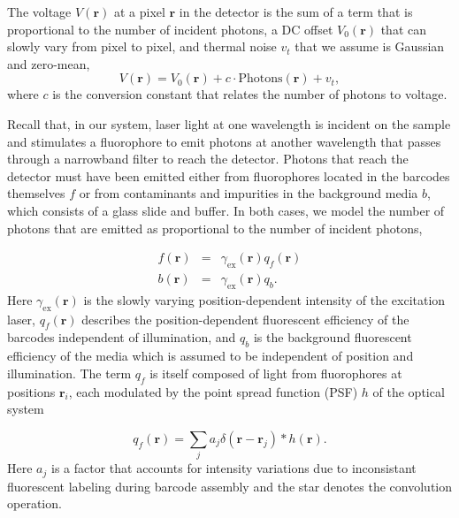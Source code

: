 The voltage $V(\mathbf{r})$ at a pixel $\mathbf{r}$ in the detector is the sum of a term that is proportional to the number of incident photons, a DC offset $V_0(\mathbf{r})$ that can slowly vary from pixel to pixel, and thermal noise $v_t$ that we assume is Gaussian and zero-mean,
\begin{equation}\label{eq:V_of_r}
V(\mathbf{r})=V_0(\mathbf{r})+c \cdot \text{Photons}(\mathbf{r}) +v_t,
\end{equation}
where $c$ is the conversion constant that relates the number of photons to voltage. 


Recall that, in our system, laser light at one wavelength is incident on the sample and stimulates a fluorophore to emit photons at another wavelength that passes through a narrowband filter to reach the detector. Photons that reach the detector must have been emitted either from fluorophores located  in the barcodes themselves $f$ or from contaminants and impurities in the background media $b$, which consists of a glass slide and buffer.  In both cases, we model the number of photons that are emitted as proportional to the number of incident photons, 

\begin{eqnarray}\label{eq:f_and_b}
f(\mathbf{r})&=&\gamma_{\text{ex}}(\mathbf{r}) q_f(\mathbf{r})\\
b(\mathbf{r})&=&\gamma_{\text{ex}}(\mathbf{r}) q_b.
\end{eqnarray}
Here $\gamma_{\text{ex}}(\mathbf{r})$ is the slowly varying position-dependent intensity of the excitation laser,  $q_f(\mathbf{r})$ describes the position-dependent fluorescent efficiency of the barcodes independent of illumination, and $q_b$ is the background fluorescent efficiency of the media which is assumed to be independent of position and illumination. The term $q_f$ is itself composed of light from fluorophores at positions $\mathbf{r}_i$, each modulated by the point spread function (PSF) $h$ of the optical system

\begin{equation} \label{eq:withPSF}
q_f(\mathbf{r})=\sum_j a_j \delta(\mathbf{r}-\mathbf{r}_j) * h(\mathbf{r}).
\end{equation}
Here $a_j$ is a factor that accounts for intensity variations due to inconsistant fluorescent labeling  during barcode assembly and the star denotes the convolution operation.

